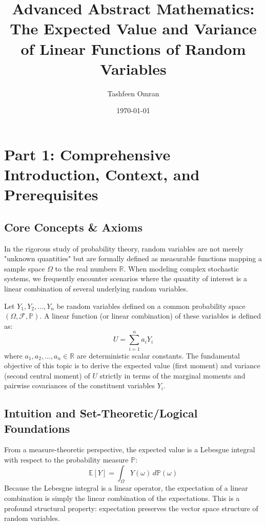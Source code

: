 \documentclass[11pt, a4paper]{article}
\theoremstyle{definition}
\theoremstyle{remark}
\newcommand{\R}{\mathbb{R}}
\newcommand{\E}{\mathbb{E}}
\newcommand{\Prob}{\mathbb{P}}
\newcommand{\F}{\mathcal{F}}
\begin{document}
\title{\textbf{Advanced Abstract Mathematics: \\ The Expected Value and Variance of Linear Functions of Random Variables}}
\author{Tashfeen Omran}
\date{\today}

\maketitle
\tableofcontents
\newpage

\section{Part 1: Comprehensive Introduction, Context, and Prerequisites}

\subsection{Core Concepts \& Axioms}
In the rigorous study of probability theory, random variables are not merely "unknown quantities" but are formally defined as measurable functions mapping a sample space $\Omega$ to the real numbers $\R$. When modeling complex stochastic systems, we frequently encounter scenarios where the quantity of interest is a linear combination of several underlying random variables. 

Let $Y_1, Y_2, \dots, Y_n$ be random variables defined on a common probability space $(\Omega, \F, \Prob)$. A linear function (or linear combination) of these variables is defined as:
\[ U = \sum_{i=1}^n a_i Y_i \]
where $a_1, a_2, \dots, a_n \in \R$ are deterministic scalar constants. The fundamental objective of this topic is to derive the expected value (first moment) and variance (second central moment) of $U$ strictly in terms of the marginal moments and pairwise covariances of the constituent variables $Y_i$.

\subsection{Intuition and Set-Theoretic/Logical Foundations}
From a measure-theoretic perspective, the expected value is a Lebesgue integral with respect to the probability measure $\Prob$:
\[ \E[Y] = \int_{\Omega} Y(\omega) \, d\Prob(\omega) \]
Because the Lebesgue integral is a linear operator, the expectation of a linear combination is simply the linear combination of the expectations. This is a profound structural property: expectation preserves the vector space structure of random variables.
\end{document}
